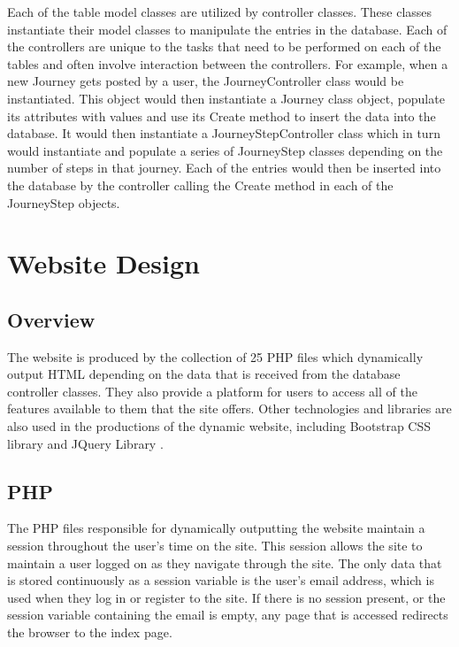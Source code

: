		Each of the table model classes are utilized by controller classes. These classes instantiate their model classes to manipulate the entries in the database. Each of the controllers are unique to the tasks that need to be performed on each of the tables and often involve interaction between the controllers. For example, when a new Journey gets posted by a user, the Journey\textunderscore Controller class would be instantiated. This object would then instantiate a Journey class object, populate its attributes with values and use its Create method to insert the data into the database. It would then instantiate a Journey\textunderscore Step\textunderscore Controller class which in turn would instantiate and populate a series of Journey\textunderscore Step classes depending on the number of steps in that journey. Each of the entries would then be inserted into the database by the controller calling the Create method in each of the Journey\textunderscore Step objects. 		
		
\section{Website Design}
	\subsection{Overview}
		The website is produced by the collection of 25 PHP files which dynamically output HTML depending on the data that is received from the database controller classes. They also provide a platform for users to access all of the features available to them that the site offers. Other technologies and libraries are also used in the productions of the dynamic website, including Bootstrap CSS library \cite{bootstrap_css} and JQuery Library \cite{jquery_library}.
		
	\subsection{PHP}
		The PHP files responsible for dynamically outputting the website maintain a session throughout the user's time on the site. This session allows the site to maintain a user logged on as they navigate through the site. The only data that is stored continuously as a session variable is the user's email address, which is used when they log in or register to the site. If there is no session present, or the session variable containing the email is empty, any page that is accessed redirects the browser to the index page.
		
